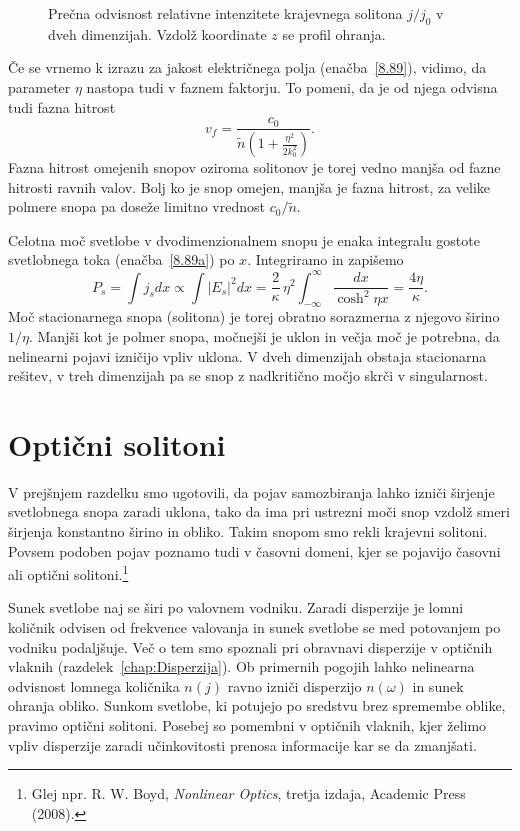 \begin{figure}[h]
\centering
\def\svgwidth{100truemm} 

\caption{Prečna odvisnost relativne intenzitete krajevnega solitona $j/j_0$ v dveh dimenzijah. 
Vzdolž koordinate $z$ se profil ohranja.}
\label{fig:soliton}
\end{figure}

Če se vrnemo k izrazu za jakost električnega polja (enačba~\ref{8.89}), vidimo, da
parameter $\eta$ nastopa tudi v faznem faktorju. To pomeni, da je od njega odvisna 
tudi fazna hitrost
\begin{equation}
v_{f}= \frac{c_0}{\tilde{n}\left(1+\frac{\eta^{2}}{2k_{0}^{2}}\right)}.
\end{equation}
Fazna hitrost omejenih snopov oziroma solitonov je torej vedno manjša od fazne hitrosti ravnih valov. 
Bolj ko je snop omejen, manjša je fazna hitrost, za velike polmere snopa pa doseže 
limitno vrednost $c_0/\tilde{n}$.

Celotna moč svetlobe v dvodimenzionalnem snopu je enaka integralu
gostote svetlobnega toka (enačba~\ref{8.89a}) po $x$. Integriramo in zapišemo 
\begin{equation}
P_s = \int j_s dx \propto \int |E_s|^2 dx  = 
\frac{2}{\kappa}\,\eta^{2}\int_{-\infty}^{\infty}\frac{dx}
{\cosh^{2}\eta x}=\frac{4\eta}{\kappa}.
\label{eq:solj}
\end{equation}
Moč stacionarnega snopa (solitona) je torej obratno sorazmerna 
z njegovo širino $1/\eta$. Manjši kot je polmer snopa, močnejši je uklon
in večja moč je potrebna, da nelinearni pojavi izničijo vpliv uklona. 
V dveh dimenzijah obstaja stacionarna rešitev, v treh dimenzijah pa 
se snop z nadkritično močjo skrči v singularnost.

\section{Optični solitoni}
\label{chap:soliton}
V prejšnjem razdelku smo ugotovili, da pojav samozbiranja lahko izniči širjenje 
svetlobnega snopa zaradi uklona, tako da ima pri
ustrezni moči snop vzdolž smeri širjenja konstantno širino in obliko. Takim snopom 
smo rekli krajevni solitoni. Povsem podoben pojav poznamo tudi v časovni 
domeni, kjer se pojavijo časovni ali optični solitoni.\footnote{Glej npr. R. W. 
Boyd, {\it Nonlinear Optics}, tretja izdaja, Academic Press (2008).}

Sunek svetlobe  naj se širi po valovnem vodniku. Zaradi disperzije je lomni količnik
odvisen od frekvence valovanja in sunek svetlobe se med potovanjem po vodniku podaljšuje. 
Več o tem smo spoznali pri 
obravnavi disperzije v optičnih vlaknih (razdelek~\ref{chap:Disperzija}). 
Ob primernih pogojih lahko nelinearna odvisnost lomnega količnika $n(j)$ 
ravno izniči disperzijo $n(\omega)$ in sunek
ohranja obliko. Sunkom svetlobe, ki potujejo po sredstvu brez spremembe
oblike, pravimo optični solitoni. Posebej so pomembni v optičnih vlaknih, 
kjer želimo  vpliv disperzije zaradi učinkovitosti prenosa
informacije kar se da zmanjšati. 

